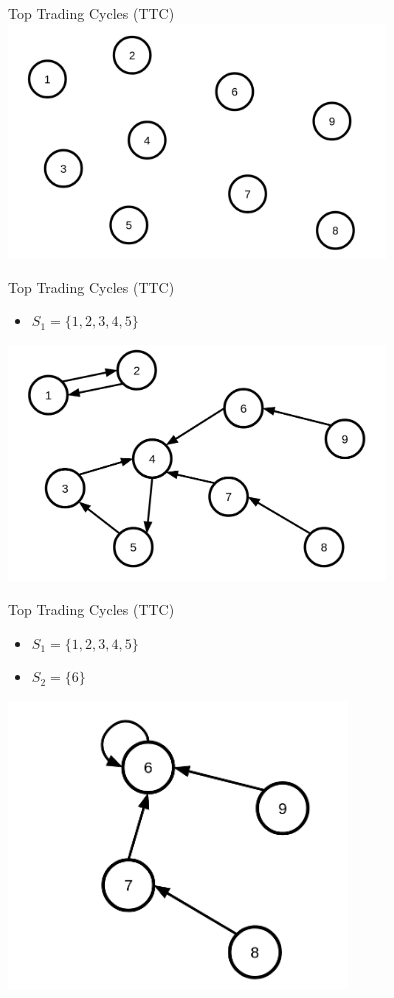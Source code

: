 \begin{frame}{Top Trading Cycles (TTC)}
    \centering
    \includegraphics[width=10cm]{img/ttc/ttc1.png}
\end{frame}
\begin{frame}{Top Trading Cycles (TTC)}
    \begin{itemize}
    \item <2-> $S_1 = \{1,2,3,4,5\}$
    \end{itemize}    
    \centering
    \includegraphics[width=10cm]{img/ttc/ttc2.png}
\end{frame}
\begin{frame}{Top Trading Cycles (TTC)}
    \begin{itemize}
    \item $S_1 = \{1,2,3,4,5\}$
    \item <2-> $S_2 = \{6\}$
    \end{itemize}   
    \centering
    \includegraphics[width=9cm]{img/ttc/ttc3.png}
\end{frame}

